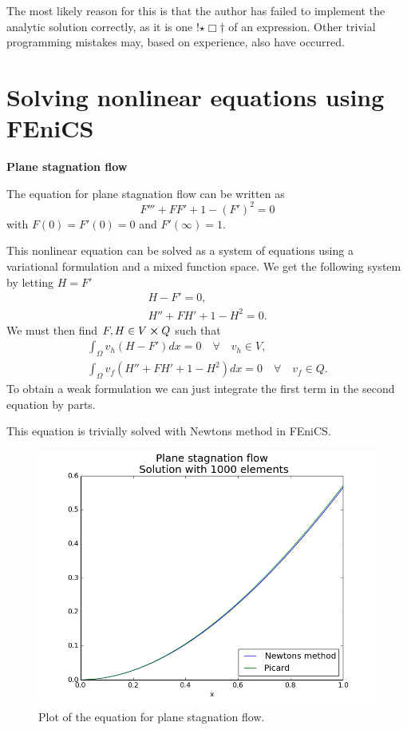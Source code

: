 \documentclass[11pt,a4paper,english]{article}
\numberwithin{equation}{section}
\begin{document}
The most likely reason for this is that the author has failed to implement the analytic solution correctly, as it is one !$\star \Box \dagger$ of an expression. Other trivial programming mistakes may, based on experience, also have occurred.



\section{Solving nonlinear equations using FEniCS}

\textbf{Plane stagnation flow}

The equation for plane stagnation flow can be written as
\begin{equation}
F''' + FF' + 1 - (F')^2 = 0
\end{equation}
with $F(0) = F'(0) = 0$ and $F'(\infty)=1$.

This nonlinear equation can be solved as a system of equations using a variational formulation and a mixed function space. We get the following system by letting $H=F'$
\begin{align}
H - F' = 0, \\
H'' + FH' + 1 - H^2 = 0.
\end{align}
We must then find $F,H \in V \cross Q$ such that 
\begin{align*}
\int_\Omega v_h(H - F') dx =0 \quad \forall \quad v_h \in V, \\
\int_\Omega v_f(H'' + FH' + 1 - H^2) dx = 0 \quad \forall \quad  v_f \in Q.
\end{align*}
To obtain a weak formulation we can just integrate the first term in the second equation by parts. 

This equation is trivially solved with Newtons method in FEniCS.

\begin{figure}[h!]
\begin{center}
  \includegraphics[scale=0.4]{plane_stag.png}
  \end{center}
  \caption{Plot of the equation for plane stagnation flow.}
  \label{fig:stokes_square}
\end{figure}
\end{document}
